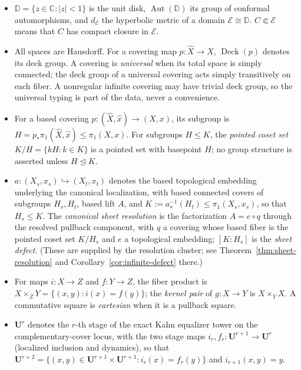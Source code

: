 \documentclass[11pt,reqno]{amsart}
\theoremstyle{definition}
\theoremstyle{remark}
\begin{document}
\begin{itemize}
\item \(\mathbb D=\{z\in\mathbb C:\lvert z\rvert<1\}\) is the unit disk, \(\operatorname{Aut}(\mathbb D)\) its group of conformal automorphisms, and \(d_{\mathcal E}\) the hyperbolic metric of a domain \(\mathcal E\cong\mathbb D\).  \(C\Subset\mathcal E\) means that \(C\) has compact closure in \(\mathcal E\).

\item All spaces are Hausdorff.  For a covering map \(p\colon\widehat X\to X\), \(\operatorname{Deck}(p)\) denotes its deck group.  A covering is \emph{universal} when its total space is simply connected; the deck group of a universal covering acts simply transitively on each fiber.  A nonregular infinite covering may have trivial deck group, so the universal typing is part of the data, never a convenience.

\item For a based covering \(p\colon(\widehat X,\widehat x)\to(X,x)\), its subgroup is \(H=p_*\pi_1(\widehat X,\widehat x)\le\pi_1(X,x)\).  For subgroups \(H\le K\), the \emph{pointed coset set} \(K/H=\{kH:k\in K\}\) is a pointed set with basepoint \(H\); no group structure is asserted unless \(H\trianglelefteq K\).

\item \(a\colon(X_s,x_s)\hookrightarrow(X_t,x_t)\) denotes the based topological embedding underlying the canonical localization, with based connected covers of subgroups \(H_s,H_t\), based lift \(A\), and \(K:=a_*^{-1}(H_t)\le\pi_1(X_s,x_s)\), so that \(H_s\le K\).  The \emph{canonical sheet resolution} is the factorization \(A=e\circ q\) through the resolved pullback component, with \(q\) a covering whose based fiber is the pointed coset set \(K/H_s\) and \(e\) a topological embedding; \([K:H_s]\) is the \emph{sheet defect}.  (These are supplied by the resolution cluster; see Theorem~\ref{thm:sheet-resolution} and Corollary~\ref{cor:infinite-defect} there.)

\item For maps \(i\colon X\to Z\) and \(f\colon Y\to Z\), the fiber product is \(X\times_ZY=\{(x,y):i(x)=f(y)\}\); the \emph{kernel pair} of \(g\colon X\to Y\) is \(X\times_YX\).  A commutative square is \emph{cartesian} when it is a pullback square.

\item \(\mathbf U^r\) denotes the \(r\)-th stage of the exact Kahn equalizer tower on the complementary-cover locus, with the two stage maps \(i_r,f_r\colon\mathbf U^{r+1}\to\mathbf U^{r}\) (localized inclusion and dynamics), so that
\(\mathbf U^{r+2}=\{(x,y)\in\mathbf U^{r+1}\times\mathbf U^{r+1}:i_r(x)=f_r(y)\}\) and \(i_{r+1}(x,y)=y\).


\end{itemize}
\end{document}
